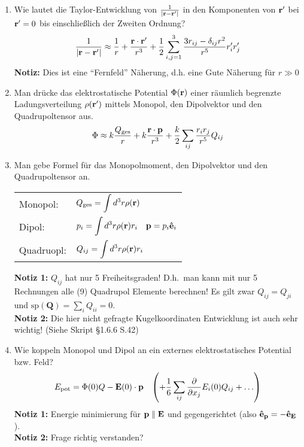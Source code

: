 \documentclass{scrartcl}
\newcommand{\rr}[1]{\frac{#1}{\abs{\vb{r}-\vb{r}'}}}
\newcommand{\ds}{\displaystyle}
\begin{document}
  \begin{enumerate}

    \item Wie lautet die Taylor-Entwicklung von $\rr{1}$ in den Komponenten
          von $\vb r'$ bei $\vb r'=0$ bis einschließlich der Zweiten
          Ordnung?
          $$ 
          \rr{1}\approx \frac{1}{r}+\frac{\vb r\cdot\vb r'}{r^3} +
          \frac{1}{2}\sum_{i,j=1}^3\frac{3r_{ij}-\delta_{ij}r^2}{r^5}
          r_i'r_j'
          $$
          \textbf{Notiz:} Dies ist eine ``Fernfeld'' Näherung, d.h. 
          eine Gute Näherung für $r\gg 0$

    \item Man drücke das elektrostatische Potential $\Phi(\vb r)$ einer
          räumlich begrenzte Ladungsverteilung $\rho(\vb r')$ mittels
          Monopol, den Dipolvektor und den Quadrupoltensor aus.
          $$
          \Phi\approx k\frac{Q_\text{ges}}{r} +
          k\frac{\vb r\cdot \vb p}{r^3} +
          \frac{k}{2} \sum_{ij}\frac{r_ir_j}{r^5}Q_{ij}
          $$

    \item Man gebe Formel für das Monopolmoment, den Dipolvektor und den
          Quadrupoltensor an.
          \begin{center}
          \begin{tabular}{ll}
            Monopol:    & $\ds Q_{\text{ges}}=\int d^3r\rho(\vb r)$\\
            Dipol:      & $\ds p_i=\int d^3r\rho(\vb r)r_i
                               \quad\vb p=p_i\vu{e}_i$\\
            Quadruopl:  & $\ds Q_{ij}=\int d^3r\rho(\vb r)r_i$\\
          \end{tabular}
          \end{center}
          \textbf{Notiz 1:} $Q_{ij}$ hat nur 5 Freiheitsgraden! D.h.\ man kann           mit nur 5 Rechnungen alle (9) Quadrupol Elemente berechnen! Es
          gilt zwar $Q_{ij}=Q_{ji}$ und 
          $\text{sp}(\bm Q)=\sum_i Q_{ii}=0$.\\
          \textbf{Notiz 2:} Die hier nicht gefragte Kugelkoordinaten
          Entwicklung ist auch sehr wichtig! (Siehe Skript §1.6.6 S.42)

    \item Wie koppeln Monopol und Dipol an ein externes elektrostatisches
          Potential bzw. Feld?
          $$E_{\text{pot}}=\Phi(0)Q-\vb E(0)\cdot\vb p 
          \quad\qty(+ \frac{1}{6}\sum_{ij}\pdv{x_j}E_i(0)Q_{ij}+\ldots)$$
          \textbf{Notiz 1:} Energie minimierung für $\vb p\parallel \vb E$
          und gegengerichtet (also $\vu e_{\vb p}=-\vu e_{\vb E}$).\\
          \textbf{Notiz 2:} Frage richtig verstanden?


\end{enumerate}
\end{document}
